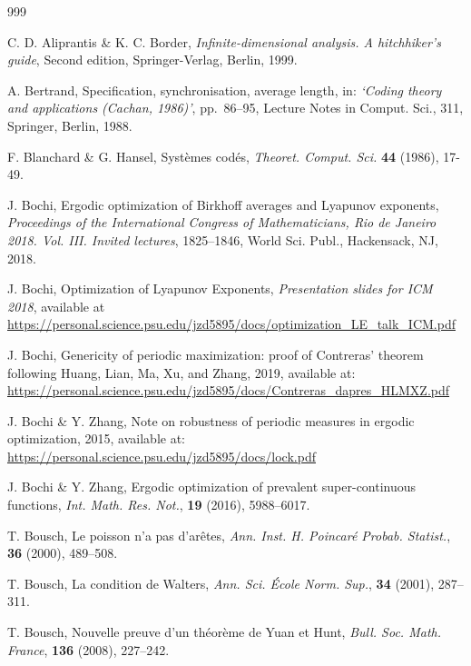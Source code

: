 \documentclass[reqno,11pt]{amsart}
\theoremstyle{definition}
\theoremstyle{remark}
\theoremstyle{remark}
\numberwithin{equation}{section}
\begin{document}
\begin{thebibliography}{999}

 C. D. Aliprantis \& K. C. Border, 
{\it Infinite-dimensional analysis.
A hitchhiker's guide}, Second edition,
Springer-Verlag, Berlin, 1999.


 A. Bertrand, 
Specification, synchronisation, average length,
in: {\it `Coding theory and applications (Cachan, 1986)'}, pp.~86--95, 
Lecture Notes in Comput. Sci., 311, Springer, Berlin, 1988.

     F. Blanchard \& G. Hansel, Syst\`emes cod\'es, 
{\it Theoret. Comput. Sci.}
{\bf 44} (1986),
17-49.



	 J. Bochi,
 Ergodic optimization of Birkhoff averages and Lyapunov exponents,
{\it Proceedings of the International Congress of Mathematicians, Rio de Janeiro 2018. Vol.
 III. Invited lectures}, 1825--1846, World Sci. Publ., Hackensack, NJ, 2018.

 J. Bochi,  Optimization of Lyapunov Exponents, {\it Presentation slides for ICM 2018},  
available at \url{https://personal.science.psu.edu/jzd5895/docs/optimization_LE_talk_ICM.pdf} 

		J. Bochi,
		Genericity of periodic maximization: proof of Contreras' theorem following Huang, Lian, Ma, Xu, and Zhang,
		 2019,
available at: \url{https://personal.science.psu.edu/jzd5895/docs/Contreras_dapres_HLMXZ.pdf}

    J. Bochi \& Y. Zhang, Note on robustness of periodic measures in ergodic optimization,
2015,  available at: \url{https://personal.science.psu.edu/jzd5895/docs/lock.pdf}


 J. Bochi \& Y. Zhang, 
Ergodic optimization of prevalent super-continuous functions,
{\it Int. Math. Res. Not.}, {\bf 19} (2016), 5988--6017.





     T. Bousch, Le poisson n'a pas d'ar\^{e}tes, 
{\it Ann. Inst. H. Poincar\'{e} Probab. Statist.}, {\bf 36} (2000), 489--508.

	 T. Bousch, La condition de Walters,  {\it Ann. Sci. \'{E}cole Norm. Sup.},
{ \bf 34} (2001), 287--311.

     T. Bousch, Nouvelle preuve d'un th\'eor\`eme de Yuan et Hunt,
{\it Bull. Soc. Math. France}, {\bf 136}
    (2008), 227--242.



\end{thebibliography}
\end{document}

